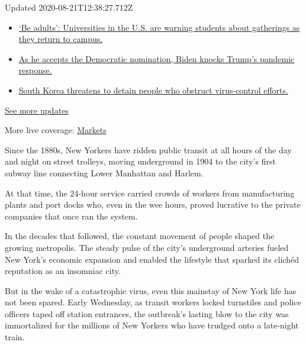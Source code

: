 Updated 2020-08-21T12:38:27.712Z

\begin{itemize}
\tightlist
\item
  \href{https://www.nytimes3xbfgragh.onion/2020/08/21/world/covid-19-coronavirus.html?action=click\&pgtype=Article\&state=default\&region=MAIN_CONTENT_1\&context=storylines_live_updates\#link-6a60a19d}{`Be
  adults': Universities in the U.S. are warning students about
  gatherings as they return to campus.}
\item
  \href{https://www.nytimes3xbfgragh.onion/2020/08/21/world/covid-19-coronavirus.html?action=click\&pgtype=Article\&state=default\&region=MAIN_CONTENT_1\&context=storylines_live_updates\#link-324af071}{As
  he accepts the Democratic nomination, Biden knocks Trump's pandemic
  response.}
\item
  \href{https://www.nytimes3xbfgragh.onion/2020/08/21/world/covid-19-coronavirus.html?action=click\&pgtype=Article\&state=default\&region=MAIN_CONTENT_1\&context=storylines_live_updates\#link-191d44be}{South
  Korea threatens to detain people who obstruct virus-control efforts.}
\end{itemize}

\href{https://www.nytimes3xbfgragh.onion/2020/08/21/world/covid-19-coronavirus.html?action=click\&pgtype=Article\&state=default\&region=MAIN_CONTENT_1\&context=storylines_live_updates}{See
more updates}

More live coverage:
\href{https://www.nytimes3xbfgragh.onion/live/2020/08/21/business/stock-market-today-coronavirus?action=click\&pgtype=Article\&state=default\&region=MAIN_CONTENT_1\&context=storylines_live_updates}{Markets}

Since the 1880s, New Yorkers have ridden public transit at all hours of
the day and night on street trolleys, moving underground in 1904 to the
city's first subway line connecting Lower Manhattan and Harlem.

At that time, the 24-hour service carried crowds of workers from
manufacturing plants and port docks who, even in the wee hours, proved
lucrative to the private companies that once ran the system.

In the decades that followed, the constant movement of people shaped the
growing metropolis. The steady pulse of the city's underground arteries
fueled New York's economic expansion and enabled the lifestyle that
sparked its clichéd reputation as an insomniac city.

But in the wake of a catastrophic virus, even this mainstay of New York
life has not been spared. Early Wednesday, as transit workers locked
turnstiles and police officers taped off station entrances, the
outbreak's lasting blow to the city was immortalized for the millions of
New Yorkers who have trudged onto a late-night train.

